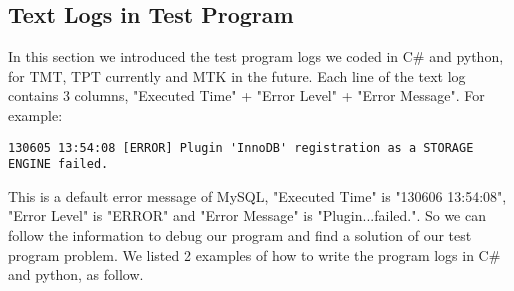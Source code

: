 \subsection{Text Logs in Test Program}
In this section we introduced the test program logs we coded in C\# and python, for TMT, TPT currently and MTK in the future.
Each line of the text log contains 3 columns, "Executed Time" + "Error Level" + "Error Message".
For example: 
\begin{lstlisting}
130605 13:54:08 [ERROR] Plugin 'InnoDB' registration as a STORAGE ENGINE failed. 
\end{lstlisting}
This is a default error message of MySQL, "Executed Time" is "130606 13:54:08", "Error Level" is "ERROR" and "Error Message" is "Plugin...failed.".
So we can follow the information to debug our program and find a solution of our test program problem.
We listed 2 examples of how to write the program logs in C\# and python, as follow.
